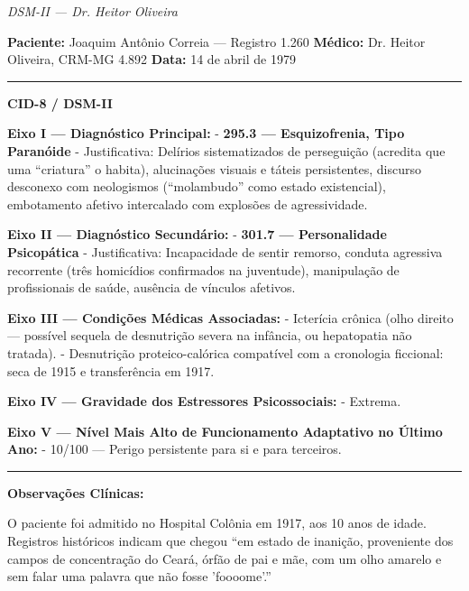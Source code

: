 
\noindent \textit{DSM-II --- Dr. Heitor Oliveira}

\noindent \textbf{Paciente:} Joaquim Antônio Correia --- Registro 1.260
\textbf{Médico:} Dr. Heitor Oliveira, CRM-MG 4.892
\textbf{Data:} 14 de abril de 1979

\vspace{0.5em}\noindent\rule{\textwidth}{0.5pt}\vspace{0.5em}

\noindent \textbf{CID-8 / DSM-II}

\noindent \textbf{Eixo I --- Diagnóstico Principal:}
- \textbf{295.3 --- Esquizofrenia, Tipo Paranóide}
  - Justificativa: Delírios sistematizados de perseguição (acredita que uma \textquotedblleft{}criatura\textquotedblright{} o habita), alucinações visuais e táteis persistentes, discurso desconexo com neologismos (\textquotedblleft{}molambudo\textquotedblright{} como estado existencial), embotamento afetivo intercalado com explosões de agressividade.

\noindent \textbf{Eixo II --- Diagnóstico Secundário:}
- \textbf{301.7 --- Personalidade Psicopática}
  - Justificativa: Incapacidade de sentir remorso, conduta agressiva recorrente (três homicídios confirmados na juventude), manipulação de profissionais de saúde, ausência de vínculos afetivos.

\noindent \textbf{Eixo III --- Condições Médicas Associadas:}
- Icterícia crônica (olho direito --- possível sequela de desnutrição severa na infância, ou hepatopatia não tratada).
- Desnutrição proteico-calórica compatível com a cronologia ficcional: seca de 1915 e transferência em 1917.

\noindent \textbf{Eixo IV --- Gravidade dos Estressores Psicossociais:}
- Extrema.

\noindent \textbf{Eixo V --- Nível Mais Alto de Funcionamento Adaptativo no Último Ano:}
- 10/100 --- Perigo persistente para si e para terceiros.

\vspace{0.5em}\noindent\rule{\textwidth}{0.5pt}\vspace{0.5em}

\noindent \textbf{Observações Clínicas:}

\noindent O paciente foi admitido no Hospital Colônia em 1917, aos 10 anos de idade. Registros históricos indicam que chegou \textquotedblleft{}em estado de inanição, proveniente dos campos de concentração do Ceará, órfão de pai e mãe, com um olho amarelo e sem falar uma palavra que não fosse 'foooome'.\textquotedblright{}

